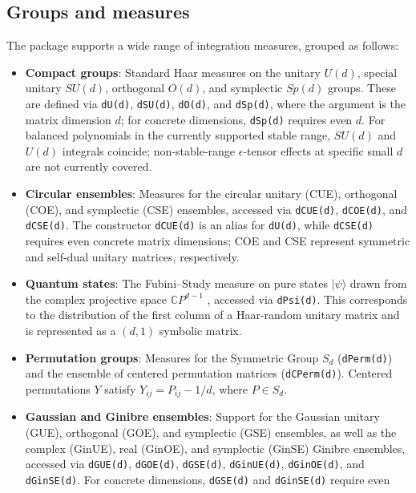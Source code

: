 \documentclass[manuscript,screen]{acmart}
\begin{document}
\subsection{Groups and measures}
The package supports a wide range of integration measures, grouped as follows:
\begin{itemize}
    \item \textbf{Compact groups}: Standard Haar measures on the unitary $U(d)$,
    special unitary $SU(d)$, orthogonal $O(d)$, and symplectic $Sp(d)$ groups.
    These are defined via \texttt{dU(d)}, \texttt{dSU(d)}, \texttt{dO(d)}, and
    \texttt{dSp(d)}, where the argument is the matrix dimension $d$; for
    concrete dimensions, \texttt{dSp(d)} requires even $d$. For balanced
    polynomials in the currently supported stable range, $SU(d)$ and $U(d)$
    integrals coincide; non-stable-range $\epsilon$-tensor effects at specific
    small $d$ are not currently covered.
    \item \textbf{Circular ensembles}: Measures for the circular unitary (CUE),
    orthogonal (COE), and symplectic (CSE) ensembles, accessed via
    \texttt{dCUE(d)}, \texttt{dCOE(d)}, and \texttt{dCSE(d)}. The constructor
    \texttt{dCUE(d)} is an alias for \texttt{dU(d)}, while \texttt{dCSE(d)}
    requires even concrete matrix dimensions; COE and CSE represent symmetric
    and self-dual unitary matrices, respectively.
    \item \textbf{Quantum states}: The Fubini--Study measure on pure states
    $|\psi\rangle$ drawn from the complex projective space $\mathbb{C}P^{d-1}$
    \cite{zyczkowski2001induced, bengtsson2017geometry}, accessed via
    \texttt{dPsi(d)}. This corresponds to the distribution of the first
    column of a Haar-random unitary matrix and is represented as a $(d, 1)$ symbolic matrix.
    \item \textbf{Permutation groups}: Measures for the Symmetric Group $S_d$
    (\texttt{dPerm(d)}) and the ensemble of centered permutation matrices
    (\texttt{dCPerm(d)}). Centered permutations $Y$ satisfy $Y_{ij} = P_{ij} - 1/d$, where $P \in S_d$.
    \item \textbf{Gaussian and Ginibre ensembles}: Support for the Gaussian
    unitary (GUE), orthogonal (GOE), and symplectic (GSE) ensembles, as well as
    the complex (GinUE), real (GinOE), and symplectic (GinSE) Ginibre ensembles,
    accessed via \texttt{dGUE(d)}, \texttt{dGOE(d)}, \texttt{dGSE(d)},
    \texttt{dGinUE(d)}, \texttt{dGinOE(d)}, and \texttt{dGinSE(d)}. For
    concrete dimensions, \texttt{dGSE(d)} and \texttt{dGinSE(d)} require even

\end{itemize}
\end{document}
